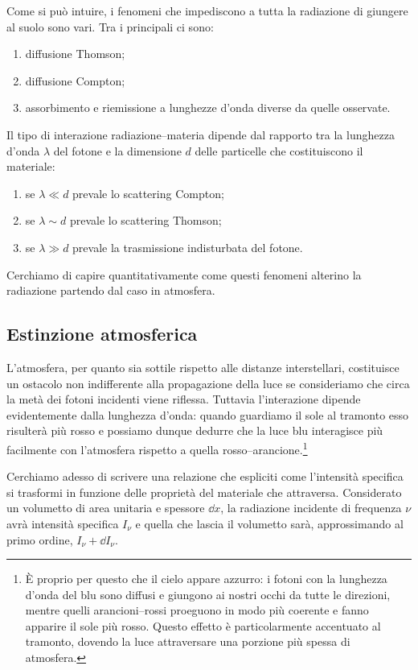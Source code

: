     Come si può intuire, i fenomeni che impediscono a tutta la radiazione di giungere al suolo sono vari. Tra i principali ci sono:
    \begin{enumerate}[label=\ding{70}]
        \item diffusione Thomson;
        \item diffusione Compton;
        \item assorbimento e riemissione a lunghezze d'onda diverse da quelle osservate.
    \end{enumerate}
    Il tipo di interazione radiazione--materia dipende dal rapporto tra la lunghezza d'onda $\lambda$ del fotone e la dimensione $d$ delle particelle che costituiscono il materiale:
    \begin{enumerate}[label=\ding{70}]
        \item se $\lambda \ll d$ prevale lo scattering Compton;
        \item se $\lambda \sim d$ prevale lo scattering Thomson;
        \item se $\lambda \gg d$ prevale la trasmissione indisturbata del fotone. 
    \end{enumerate}
    
    Cerchiamo di capire quantitativamente come questi fenomeni alterino la radiazione partendo dal caso in atmosfera.
    \subsection{Estinzione atmosferica}
        L'atmosfera, per quanto sia sottile rispetto alle distanze interstellari, costituisce un ostacolo non indifferente alla propagazione della luce se consideriamo che circa la metà dei fotoni incidenti viene riflessa. Tuttavia l'interazione dipende evidentemente dalla lunghezza d'onda: quando guardiamo il sole al tramonto esso risulterà più rosso e possiamo dunque dedurre che la luce blu interagisce più facilmente con l'atmosfera rispetto a quella rosso--arancione.\footnote{È proprio per questo che il cielo appare azzurro: i fotoni con la lunghezza d'onda del blu sono diffusi e giungono ai nostri occhi da tutte le direzioni, mentre quelli arancioni--rossi proeguono in modo più coerente e fanno apparire il sole più rosso. Questo effetto è particolarmente accentuato al tramonto, dovendo la luce attraversare una porzione più spessa di atmosfera.}

        Cerchiamo adesso di scrivere una relazione che espliciti come l'intensità specifica si trasformi in funzione delle proprietà del materiale che attraversa. Considerato un volumetto di area unitaria e spessore $\dd{x}$, la radiazione incidente di frequenza $\nu$ avrà intensità specifica $I_\nu$ e quella che lascia il volumetto sarà, approssimando al primo ordine, $I_\nu + \dd{I_\nu}$.

